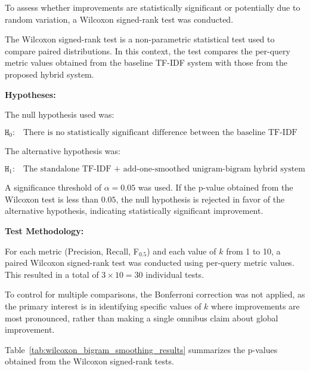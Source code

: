 To assess whether improvements are statistically significant or potentially due to random variation, a Wilcoxon signed-rank test was conducted.

The Wilcoxon signed-rank test is a non-parametric statistical test used to compare paired distributions. In this context, the test compares the per-query metric values obtained from the baseline TF-IDF system with those from the proposed hybrid system.

\vspace{0.2cm}

\textbf{Hypotheses:}

The null hypothesis used was:

\[
\texttt{H}_0\text{:} \quad \text{There is no statistically significant difference between the baseline TF-IDF system and the standalone TF-IDF + add-one-smoothed unigram-bigram hybrid retrieval system.}
\]

The alternative hypothesis was:

\[
\texttt{H}_1\text{:} \quad \text{The standalone TF-IDF + add-one-smoothed unigram-bigram hybrid system produces statistically significant retrieval improvements over the baseline TF-IDF system.}
\]

A significance threshold of $\alpha = 0.05$ was used. If the p-value obtained from the Wilcoxon test is less than $0.05$, the null hypothesis is rejected in favor of the alternative hypothesis, indicating statistically significant improvement.

\vspace{0.2cm}

\textbf{Test Methodology:}

For each metric (Precision, Recall, F$_{0.5}$) and each value of $k$ from 1 to 10, a paired Wilcoxon signed-rank test was conducted using per-query metric values. This resulted in a total of $3 \times 10 = 30$ individual tests.

To control for multiple comparisons, the Bonferroni correction was not applied, as the primary interest is in identifying specific values of $k$ where improvements are most pronounced, rather than making a single omnibus claim about global improvement.

\vspace{0.2cm}

Table~\ref{tab:wilcoxon_bigram_smoothing_results} summarizes the p-values obtained from the Wilcoxon signed-rank tests.

